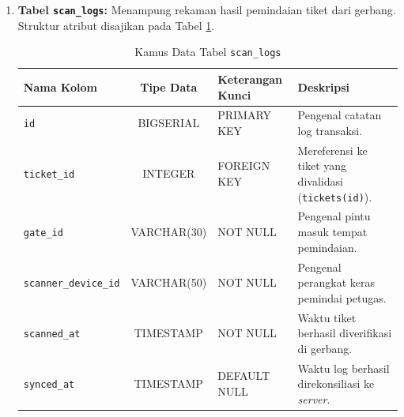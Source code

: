\begin{enumerate}
    \item \textbf{Tabel \texttt{scan\_logs}:} Menampung rekaman hasil pemindaian tiket dari gerbang. Struktur atribut disajikan pada Tabel \ref{tab:table_scan_logs}.
    \begin{table}[htbp]
        \caption{Kamus Data Tabel \texttt{scan\_logs}}
        \label{tab:table_scan_logs}
        \centering
        \begin{tabularx}{\textwidth}{ l c l X }
            \toprule
            \textbf{Nama Kolom} & \textbf{Tipe Data} & \textbf{Keterangan Kunci} & \textbf{Deskripsi} \\
            \midrule
            \texttt{id} & BIGSERIAL & PRIMARY KEY & Pengenal catatan log transaksi. \\
            \texttt{ticket\_id} & INTEGER & FOREIGN KEY & Mereferensi ke tiket yang divalidasi (\texttt{tickets(id)}). \\
            \texttt{gate\_id} & VARCHAR(30) & NOT NULL & Pengenal pintu masuk tempat pemindaian. \\
            \texttt{scanner\_device\_id} & VARCHAR(50) & NOT NULL & Pengenal perangkat keras pemindai petugas. \\
            \texttt{scanned\_at} & TIMESTAMP & NOT NULL & Waktu tiket berhasil diverifikasi di gerbang. \\
            \texttt{synced\_at} & TIMESTAMP & DEFAULT NULL & Waktu log berhasil direkonsiliasi ke \textit{server}. \\
            \bottomrule
        \end{tabularx}
    \end{table}
\end{enumerate}

